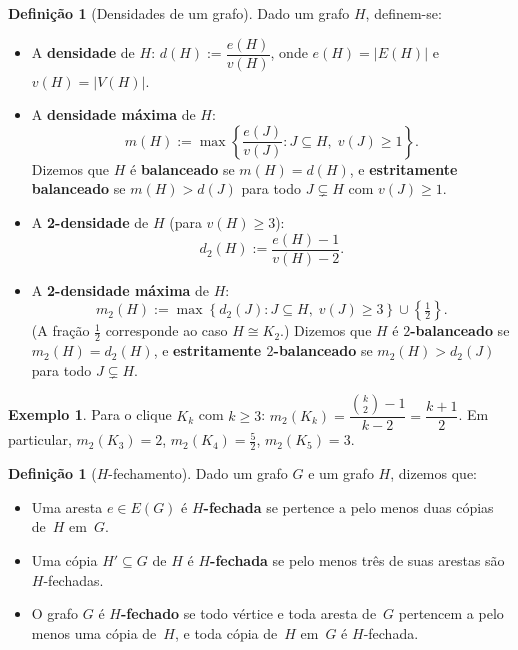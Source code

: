 \documentclass[reqno, 12pt]{amsart}
\numberwithin{equation}{section}
\theoremstyle{plain}
\theoremstyle{definition}
\newtheorem{definition}[theorem]{Definição}
\newtheorem{example}[theorem]{Exemplo}
\newcommand{\mdens}{m_2}
\newcommand{\maxdens}{m}
\begin{document}
\begin{definition}[Densidades de um grafo]
  \label{def:densidades}
  Dado um grafo $H$, definem-se:
  \begin{itemize}
    \item A \textbf{densidade} de $H$:
          $d(H) := \dfrac{e(H)}{v(H)}$, onde $e(H) = |E(H)|$ e $v(H) = |V(H)|$.

    \item A \textbf{densidade máxima} de $H$:
          \[
            \maxdens(H) := \max\!\left\{\frac{e(J)}{v(J)} : J \subseteq H,\; v(J) \ge 1\right\}.
          \]
          Dizemos que $H$ é \textbf{balanceado} se $\maxdens(H) = d(H)$, e
          \textbf{estritamente balanceado} se $\maxdens(H) > d(J)$ para todo
          $J \subsetneq H$ com $v(J) \ge 1$.

    \item A \textbf{2-densidade} de $H$ (para $v(H) \ge 3$):
          \[
            d_2(H) := \frac{e(H)-1}{v(H)-2}.
          \]

    \item A \textbf{2-densidade máxima} de $H$:
          \[
            \mdens(H) := \max\!\left\{d_2(J) : J \subseteq H,\; v(J) \ge 3\right\}
            \cup \left\{\tfrac{1}{2}\right\}.
          \]
          (A fração $\frac{1}{2}$ corresponde ao caso $H \cong K_2$.)
          Dizemos que $H$ é \textbf{$2$-balanceado} se $\mdens(H) = d_2(H)$, e
          \textbf{estritamente $2$-balanceado} se $\mdens(H) > d_2(J)$ para todo
          $J \subsetneq H$.
  \end{itemize}
\end{definition}

\begin{example}
  Para o clique $K_k$ com $k \ge 3$:
  $\mdens(K_k) = \dfrac{\binom{k}{2}-1}{k-2} = \dfrac{k+1}{2}$.
  Em particular, $\mdens(K_3) = 2$, $\mdens(K_4) = \frac{5}{2}$, $\mdens(K_5) = 3$.
\end{example}

\begin{definition}[$H$-fechamento]
  \label{def:H-fechado}
  Dado um grafo $G$ e um grafo $H$, dizemos que:
  \begin{itemize}
    \item Uma aresta $e \in E(G)$ é \textbf{$H$-fechada} se pertence a pelo menos duas cópias de~$H$ em~$G$.
    \item Uma cópia $H' \subseteq G$ de $H$ é \textbf{$H$-fechada} se pelo menos três de suas arestas são $H$-fechadas.
    \item O grafo $G$ é \textbf{$H$-fechado} se todo vértice e toda aresta de~$G$ pertencem a pelo menos uma cópia de~$H$, e toda cópia de~$H$ em~$G$ é $H$-fechada.
  \end{itemize}
\end{definition}
\end{document}
